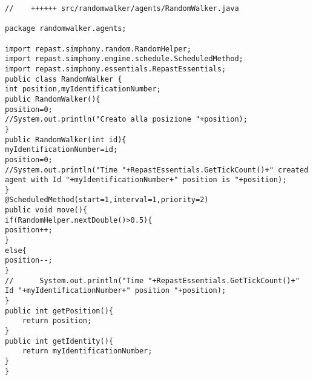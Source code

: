 \documentclass{article}
\begin{document}
\begin{verbatim}
//    ++++++ src/randomwalker/agents/RandomWalker.java

package randomwalker.agents;

import repast.simphony.random.RandomHelper;
import repast.simphony.engine.schedule.ScheduledMethod;
import repast.simphony.essentials.RepastEssentials;
public class RandomWalker {
int position,myIdentificationNumber;
public RandomWalker(){
position=0;
//System.out.println("Creato alla posizione "+position);
}
public RandomWalker(int id){
myIdentificationNumber=id;
position=0;
//System.out.println("Time "+RepastEssentials.GetTickCount()+" created agent with Id "+myIdentificationNumber+" position is "+position);
}
@ScheduledMethod(start=1,interval=1,priority=2)
public void move(){
if(RandomHelper.nextDouble()>0.5){
position++;
}
else{
position--;
}
//		System.out.println("Time "+RepastEssentials.GetTickCount()+" Id "+myIdentificationNumber+" position "+position);
}
public int getPosition(){
	return position;
}
public int getIdentity(){
	return myIdentificationNumber;
}
}
\end{verbatim}
\end{document}
